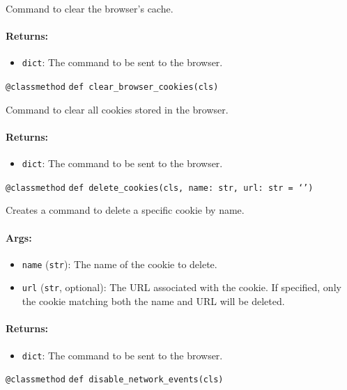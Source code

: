 \documentclass{article}
\begin{document}
\noindent Command to clear the browser's cache.

\paragraph{Returns:}
\begin{itemize}
    \item \texttt{dict}: The command to be sent to the browser.
\end{itemize}

\noindent\texttt{@classmethod}
\noindent\texttt{def clear\_browser\_cookies(cls)}

\noindent Command to clear all cookies stored in the browser.

\paragraph{Returns:}
\begin{itemize}
    \item \texttt{dict}: The command to be sent to the browser.
\end{itemize}

\noindent\texttt{@classmethod}
\noindent\texttt{def delete\_cookies(cls, name: str, url: str = `')}

\noindent Creates a command to delete a specific cookie by name.

\paragraph{Args:}
\begin{itemize}
    \item \texttt{name} (\texttt{str}): The name of the cookie to delete.
    \item \texttt{url} (\texttt{str}, optional): The URL associated with the cookie. If specified, only the cookie matching both the name and URL will be deleted.
\end{itemize}

\paragraph{Returns:}
\begin{itemize}
    \item \texttt{dict}: The command to be sent to the browser.
\end{itemize}

\noindent\texttt{@classmethod}
\noindent\texttt{def disable\_network\_events(cls)}
\end{document}
